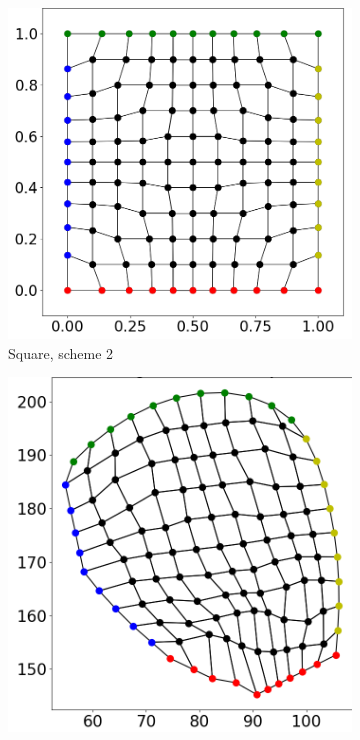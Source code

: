 \begin{figure}
  \begin{subfigure}[t]{0.24\textwidth}%
    \centering%
    \includegraphics[width=\textwidth]{images/fiber_creation/quad_2.png}%
    \caption{Square, scheme 2}%
    \label{fig:tquad_2}%
  \end{subfigure}
  \begin{subfigure}[t]{0.24\textwidth}%
    \centering%
    \includegraphics[width=\textwidth, trim=26mm 14mm 6mm 6mm, clip]{images/fiber_creation/mesh_plots/out_0_2_0_w.png}%

\end{subfigure}
\end{figure}
